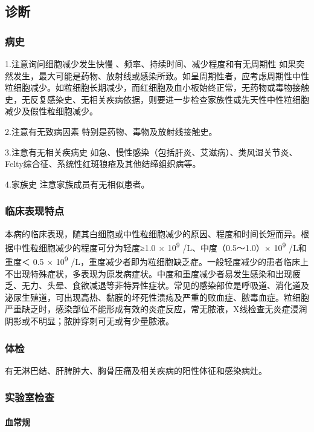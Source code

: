 \subsection{诊断}

\subsubsection{病史}

1.注意询问细胞减少发生快慢 、频率、持续时间、减少程度和有无周期性
如果突然发生，最大可能是药物、放射线或感染所致。如呈周期性者，应考虑周期性中性粒细胞减少。如粒细胞长期减少，而红细胞及血小板始终正常，无药物或毒物接触史，无反复感染史、无相关疾病依据，则要进一步检查家族性或先天性中性粒细胞减少及假性粒细胞减少。

2.注意有无致病因素 特别是药物、毒物及放射线接触史。

3.注意有无相关疾病史
如急、慢性感染（包括肝炎、艾滋病）、类风湿关节炎、Felty综合征、系统性红斑狼疮及其他结缔组织病等。

4.家族史 注意家族成员有无相似患者。

\subsubsection{临床表现特点}

本病的临床表现，随其白细胞或中性粒细胞减少的原因、程度和时间长短而异。根据中性粒细胞减少的程度可分为轻度≥1.0
× 10\textsuperscript{9} /L、中度（0.5～1.0）× 10\textsuperscript{9}
/L和重度＜ 0.5 × 10\textsuperscript{9}
/L，重度减少者即为粒细胞缺乏症。一般轻度减少的患者临床上不出现特殊症状，多表现为原发病症状。中度和重度减少者易发生感染和出现疲乏、无力、头晕、食欲减退等非特异性症状。常见的感染部位是呼吸道、消化道及泌尿生殖道，可出现高热、黏膜的坏死性溃疡及严重的败血症、脓毒血症。粒细胞严重缺乏时，感染部位不能形成有效的炎症反应，常无脓液，X线检查无炎症浸润阴影或不明显；脓肿穿刺可无或有少量脓液。

\subsubsection{体检}

有无淋巴结、肝脾肿大、胸骨压痛及相关疾病的阳性体征和感染病灶。

\subsubsection{实验室检查}

\paragraph{血常规}

